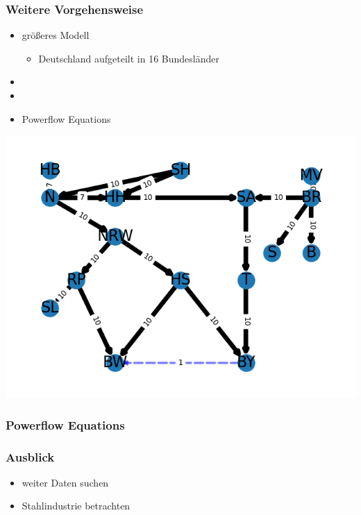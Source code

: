 \documentclass[aspectratio=169,t]{beamer}
\begin{document}
	\begin{frame}
		\frametitle{Weitere Vorgehensweise}
		\vspace*{0mm}
			\begin{minipage}{1\linewidth}
			\begin{minipage}{.5\linewidth}
				\begin{itemize}
					\item größeres Modell
					\begin{itemize}
						\item Deutschland aufgeteilt in 16 Bundesländer
					\end{itemize}
					\item 
					\item
					\item Powerflow Equations
				\end{itemize}
			\end{minipage}
			\hfill
			\begin{minipage}{.5\linewidth}
				\centering
				\includegraphics[width=.8\linewidth]{Example_graph_2.png}
				
			\end{minipage}
		\end{minipage}	
	
			
	\end{frame}
	
	
	\begin{frame}
		\frametitle{Powerflow Equations}
		
		\vspace*{-2mm}
		
		
		\vspace*{0mm}
	\end{frame}
	
	

	
	
	\begin{frame}
		\frametitle{Ausblick}
		
		\vspace*{6mm}
		\begin{itemize}
			\item weiter Daten suchen 
			\item Stahlindustrie betrachten
		\end{itemize}
			
		
	\end{frame}
	
	
	
	
	
	
	
\end{document}
